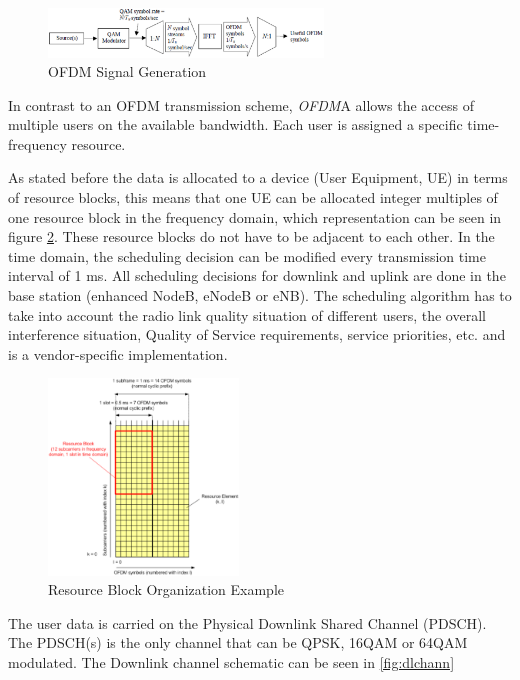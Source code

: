 \begin{figure}[htbp]
    \centering
    \includegraphics[width=0.65\textwidth]{./figures/ofdm_signal_chain}
    \caption{ OFDM Signal Generation
    \label{fig:ofdmchain}}
\end{figure}

In contrast to an OFDM transmission scheme, \textit{OFDM}A allows the access of multiple
users on the available bandwidth. Each user is assigned a specific time-frequency
resource.

As stated before the data is allocated to a device (User Equipment, UE) in terms
of resource blocks, this means that one UE can be allocated integer multiples of
one resource block in the frequency domain, which representation can be seen in
figure \ref{fig:ofdmresblk}. These resource blocks do not have to be adjacent to
each other. In the time domain, the scheduling decision can be modified every
transmission time interval of 1 ms. All scheduling decisions for downlink and
uplink are done in the base station (enhanced NodeB, eNodeB or eNB). The
scheduling algorithm has to take into account the radio link quality situation
of different users, the overall interference situation, Quality of Service
requirements, service priorities, etc. and is a vendor-specific implementation.

\begin{figure}[htbp]
    \centering
    \includegraphics[width=0.45\textwidth]{./figures/ofdm_resource_block}
    \caption{ Resource Block Organization Example
    \label{fig:ofdmresblk}}
\end{figure}

The user data is carried on the Physical Downlink Shared Channel (PDSCH). The
PDSCH(s) is the only channel that can be QPSK, 16QAM or 64QAM modulated. The
Downlink channel schematic can be seen in \ref{fig:dlchann}

